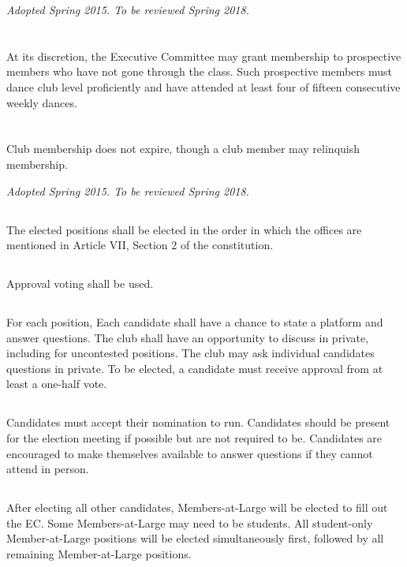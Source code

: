 \documentclass{bylaws}
\newcommand{\sptimes}[2]{\emph{Adopted #1. To be reviewed #2.}}
\begin{document}
\sptimes{Spring 2015}{Spring 2018}

\section{}At its discretion, the Executive Committee may grant membership to prospective members who have not gone through the class. Such prospective members must dance club level proficiently and have attended at least four of fifteen consecutive weekly dances.
\section{}Club membership does not expire, though a club member may relinquish membership.


\sptimes{Spring 2015}{Spring 2018}


\subsection{}The elected positions shall be elected in the order in which the offices are mentioned in Article VII, Section 2 of the constitution. 
\subsection{}Approval voting shall be used. 
\subsection{}For each position,
\duty Each candidate shall have a chance to state a platform and answer questions.
\duty The club shall have an opportunity to discuss in private, including for uncontested positions.
\duty The club may ask individual candidates questions in private.
\duty To be elected, a candidate must receive approval from at least a one-half vote.  
\subsection{}Candidates must accept their nomination to run. Candidates should be present for the election meeting if possible but are not required to be. Candidates are encouraged to make themselves available to answer questions if they cannot attend in person.
\subsection{}After electing all other candidates, Members-at-Large will be elected to fill out the EC. Some Members-at-Large may need to be students. All student-only Member-at-Large positions will be elected simultaneously first, followed by all remaining Member-at-Large positions. 
\end{document}
